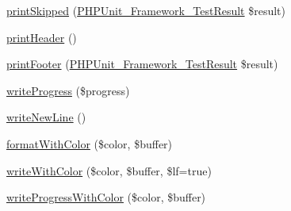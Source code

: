 \begin{DoxyCompactItemize}
\item 
\mbox{\hyperlink{class_p_h_p_unit___text_u_i___result_printer_ac16d9225f88dcfaf22a86d7ba527c913}{print\+Skipped}} (\mbox{\hyperlink{class_p_h_p_unit___framework___test_result}{P\+H\+P\+Unit\+\_\+\+Framework\+\_\+\+Test\+Result}} \$result)
\item 
\mbox{\hyperlink{class_p_h_p_unit___text_u_i___result_printer_a17bb8cfec1adb86ac32d5c4a29078065}{print\+Header}} ()
\item 
\mbox{\hyperlink{class_p_h_p_unit___text_u_i___result_printer_ad4e1bebea767b82c70d2ad1acd77fc39}{print\+Footer}} (\mbox{\hyperlink{class_p_h_p_unit___framework___test_result}{P\+H\+P\+Unit\+\_\+\+Framework\+\_\+\+Test\+Result}} \$result)
\item 
\mbox{\hyperlink{class_p_h_p_unit___text_u_i___result_printer_ae4b5d735668488399d06c4af87fe32fb}{write\+Progress}} (\$progress)
\item 
\mbox{\hyperlink{class_p_h_p_unit___text_u_i___result_printer_add23b21c4f798573e02d5881789b54e8}{write\+New\+Line}} ()
\item 
\mbox{\hyperlink{class_p_h_p_unit___text_u_i___result_printer_a2f73e1cf77fef51b9ec4c83f479e995c}{format\+With\+Color}} (\$color, \$buffer)
\item 
\mbox{\hyperlink{class_p_h_p_unit___text_u_i___result_printer_ac332cc622fb3ecd240def17aff459da1}{write\+With\+Color}} (\$color, \$buffer, \$lf=true)
\item 
\mbox{\hyperlink{class_p_h_p_unit___text_u_i___result_printer_a4c28e0ad2ecca8bcb90b4a13a567f0fb}{write\+Progress\+With\+Color}} (\$color, \$buffer)
\end{DoxyCompactItemize}
